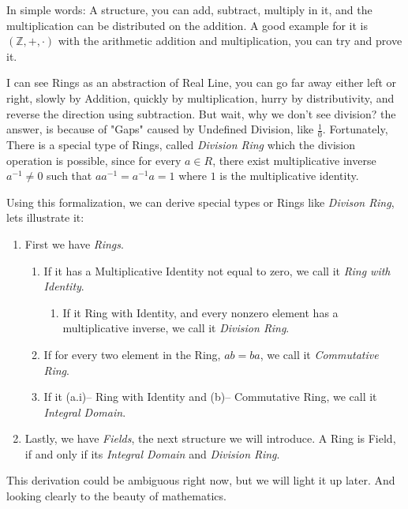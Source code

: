 In simple words: A structure, you can add, subtract, multiply in it, and the multiplication can be distributed on the addition. A good example for it is $(\mathbb{Z},+,\cdot)$ with the arithmetic addition and multiplication, you can try and prove it.

I can see Rings as an abstraction of Real Line, you can go far away either left or right, slowly by Addition, quickly by multiplication, hurry by distributivity,  and reverse the direction using subtraction. But wait, why we don't see division? the answer, is because of "Gaps" caused by Undefined Division, like $\frac{1}{0}$. Fortunately, There is a special type of Rings, called {\it Division Ring} which the division operation is possible, since for every $a \in R$, there exist multiplicative inverse $a^{-1} \neq 0$ such that $aa^{-1}=a^{-1}a=1$ where $1$ is the multiplicative identity.

Using this formalization, we can derive special types or Rings like {\it Divison Ring}, lets illustrate it: \begin{enumerate}
    \item First we have {\it Rings}.
    \begin{enumerate}
        \item If it has a Multiplicative Identity not equal to zero, we call it {\it Ring with Identity}.
            \begin{enumerate}
                \item If it Ring with Identity, and every nonzero element has a multiplicative inverse, we call it {\it Division Ring}. 
            \end{enumerate}
        \item If for every two element in the Ring, $ab=ba$, we call it {\it Commutative Ring}.
        \item If it (a.i)-- Ring with Identity and (b)-- Commutative Ring, we call it {\it Integral Domain}.
    \end{enumerate}
    \item Lastly, we have {\it Fields}, the next structure we will introduce. A Ring is Field, if and only if its {\it Integral Domain} and {\it Division Ring}.
\end{enumerate}

This derivation could be ambiguous right now, but we will light it up later. And looking clearly to the beauty of mathematics.